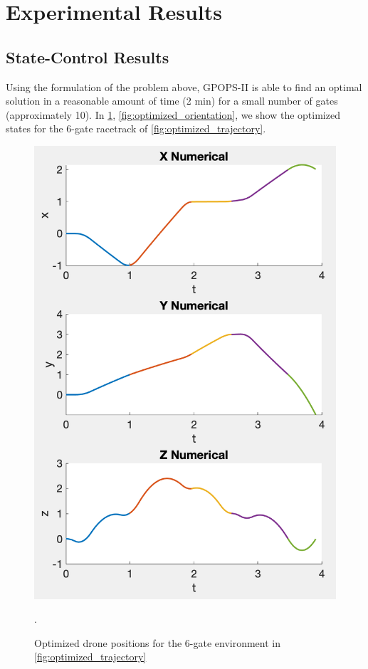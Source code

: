 
\section{Experimental Results}
\label{sec:results}

\subsection{State-Control Results}
Using the formulation of the problem above, \textrm{GPOPS-II} \cite{gpops} is able to find an optimal solution in a reasonable amount of time (2 min) for a small number of gates (approximately 10).
In \cref{fig:optimized_position}, \cref{fig:optimized_orientation}, we show the optimized states for the 6-gate racetrack of \cref{fig:optimized_trajectory}.

\begin{figure}[htbp]
  \centering
  \includegraphics[width=1.0\columnwidth]{img/position.png}
  \caption{Optimized drone positions for the 6-gate environment in \cref{fig:optimized_trajectory}}.
  \label{fig:optimized_position}
\end{figure}

